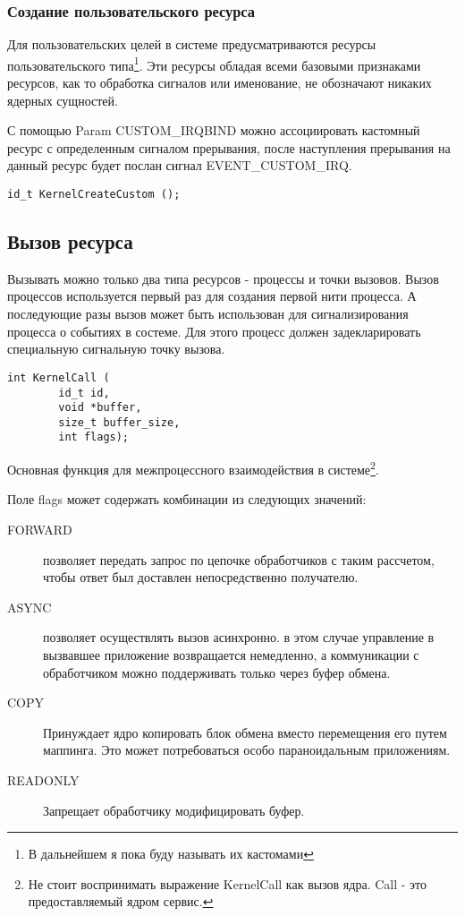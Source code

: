 \subsubsection{Создание пользовательского ресурса}

Для пользовательских целей в системе предусматриваются ресурсы пользовательского
типа\footnote{В дальнейшем я пока буду называть их кастомами}. Эти ресурсы
обладая всеми базовыми признаками ресурсов, как то обработка сигналов или
именование, не обозначают никаких ядерных сущностей.

С помощью Param CUSTOM\_IRQBIND можно ассоциировать кастомный ресурс с
определенным сигналом прерывания, после наступления прерывания на данный ресурс
будет послан сигнал EVENT\_CUSTOM\_IRQ.

\begin{verbatim}
id_t KernelCreateCustom ();
\end{verbatim}\par

\subsection{Вызов ресурса}

Вызывать можно только два типа ресурсов - процессы и точки вызовов. Вызов
процессов используется первый раз для создания первой нити процесса. А
последующие разы вызов может быть использован для сигнализирования процесса о
событиях в состеме. Для этого процесс должен задекларировать специальную
сигнальную точку вызова.

\begin{verbatim}
int KernelCall (
        id_t id,
        void *buffer,
        size_t buffer_size,
        int flags);
\end{verbatim}\par

Основная функция для межпроцессного взаимодействия в системе\footnote{Не стоит
воспринимать выражение KernelCall как вызов ядра. Call - это предоставляемый
ядром сервис.}.

Поле flags может содержать комбинации из следующих значений:

\begin{description}
\item[FORWARD] позволяет передать запрос по цепочке обработчиков с таким
рассчетом, чтобы ответ был доставлен непосредственно получателю.
\item[ASYNC] позволяет осуществлять вызов асинхронно. в этом случае управление
в вызвавшее приложение возвращается немедленно, а коммуникации с обработчиком
можно поддерживать только через буфер обмена.
\item[COPY] Принуждает ядро копировать блок обмена вместо перемещения его путем
маппинга. Это может потребоваться особо параноидальным приложениям.
\item[READONLY] Запрещает обработчику модифицировать буфер.
\end{description}\par

